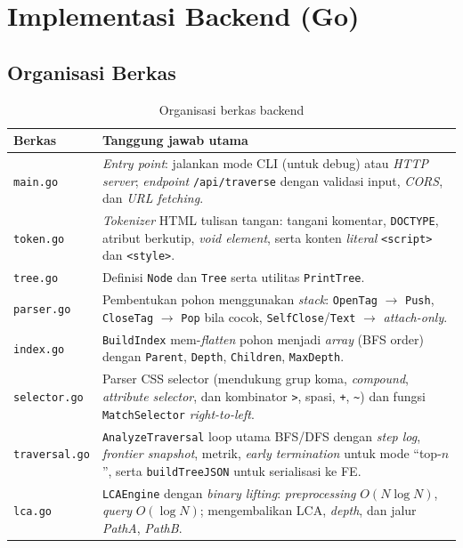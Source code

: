 \section{Implementasi Backend (Go)}

\subsection{Organisasi Berkas}

\begin{table}[H]
\centering
\caption{Organisasi berkas backend}
\begin{tabularx}{\textwidth}{|l|X|}
\hline
\textbf{Berkas} & \textbf{Tanggung jawab utama} \\
\hline
\texttt{main.go} & \textit{Entry point}: jalankan mode CLI (untuk debug) atau \textit{HTTP server}; \textit{endpoint} \texttt{/api/traverse} dengan validasi input, \textit{CORS}, dan \textit{URL fetching}. \\
\hline
\texttt{token.go} & \textit{Tokenizer} HTML tulisan tangan: tangani komentar, \texttt{DOCTYPE}, atribut berkutip, \textit{void element}, serta konten \textit{literal} \texttt{<script>} dan \texttt{<style>}. \\
\hline
\texttt{tree.go} & Definisi \texttt{Node} dan \texttt{Tree} serta utilitas \texttt{PrintTree}. \\
\hline
\texttt{parser.go} & Pembentukan pohon menggunakan \textit{stack}: \texttt{OpenTag} $\to$ \texttt{Push}, \texttt{CloseTag} $\to$ \texttt{Pop} bila cocok, \texttt{SelfClose}/\texttt{Text} $\to$ \textit{attach-only}. \\
\hline
\texttt{index.go} & \texttt{BuildIndex} mem-\textit{flatten} pohon menjadi \textit{array} (BFS order) dengan \texttt{Parent}, \texttt{Depth}, \texttt{Children}, \texttt{MaxDepth}. \\
\hline
\texttt{selector.go} & Parser CSS selector (mendukung grup koma, \textit{compound}, \textit{attribute selector}, dan kombinator \texttt{>}, spasi, \texttt{+}, \texttt{\textasciitilde}) dan fungsi \texttt{MatchSelector} \textit{right-to-left}. \\
\hline
\texttt{traversal.go} & \texttt{AnalyzeTraversal} loop utama BFS/DFS dengan \textit{step log}, \textit{frontier snapshot}, metrik, \textit{early termination} untuk mode ``top-$n$'', serta \texttt{buildTreeJSON} untuk serialisasi ke FE. \\
\hline
\texttt{lca.go} & \texttt{LCAEngine} dengan \textit{binary lifting}: \textit{preprocessing} $O(N\log N)$, \textit{query} $O(\log N)$; mengembalikan LCA, \textit{depth}, dan jalur \textit{PathA}, \textit{PathB}. \\
\hline
\end{tabularx}
\end{table}

